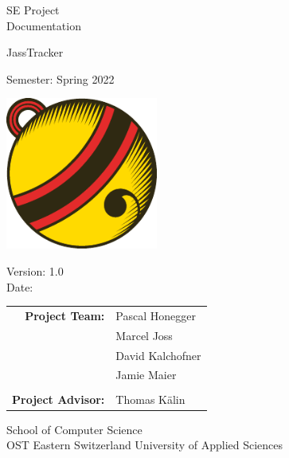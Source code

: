 \begin{titlepage}

    \begin{center}

        \vspace{1 cm}

        {\Large SE Project \\ Documentation} \\

        \vspace{0.5cm}

        {\Huge JassTracker}

        \vspace{0.5cm}

        Semester: Spring 2022

        \vspace{1 cm}

        \includegraphics[height=5cm]{resources/se-project-logo}

        \vspace{1 cm}

        Version: 1.0 \\
        Date: \DTMnow \\
        \vspace{1 cm}

        \begin{tabular}{rl}
            \textbf{Project Team:}    & Pascal Honegger \\
                                      & Marcel Joss \\
                                      & David Kalchofner \\
                                      & Jamie Maier \\
                                      &                    \\
            \textbf{Project Advisor:} & Thomas Kälin
        \end{tabular}

        \vfill


        \vspace{1cm}
        School of Computer Science\\
        OST Eastern Switzerland University of Applied Sciences

    \end{center}

\end{titlepage}
